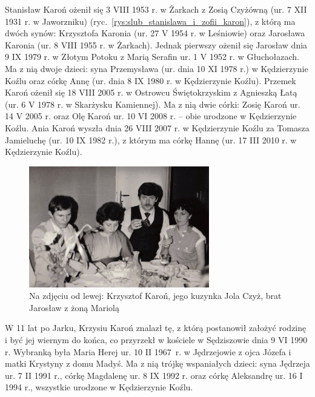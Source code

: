 Stanisław Karoń ożenił się 3 VIII 1953 r. w Żarkach z Zosią Czyżówną (ur. 7 XII 1931 r. w Jaworzniku) (ryc.~\ref{rys:slub_stanislawa_i_zofii_karon}), z którą ma dwóch synów: Krzysztofa Karonia (ur. 27 V 1954 r. w Leśniowie) oraz Jarosława Karonia (ur. 8 VIII 1955 r. w Żarkach). Jednak pierwszy ożenił się Jarosław dnia 9 IX 1979 r. w Złotym Potoku z Marią Serafin ur. 1 V 1952 r. w Głuchołazach. Ma z nią dwoje dzieci: syna Przemysława (ur. dnia 10 XI 1978 r.) w Kędzierzynie Koźlu oraz córkę Annę (ur. dnia 8 IX 1980 r. w Kędzierzynie Koźlu). Przemek Karoń ożenił się 18 VIII 2005 r. w Ostrowcu Świętokrzyskim z Agnieszką Łatą (ur. 6 V 1978 r. w Skarżysku Kamiennej). Ma z nią dwie córki: Zosię Karoń ur. 14 V 2005 r. oraz Olę Karoń ur. 10 VI 2008 r. -- obie urodzone w Kędzierzynie Koźlu. Ania Karoń wyszła dnia 26 VIII 2007 r. w Kędzierzynie Koźlu za Tomasza Jamieluchę (ur. 10 IX 1982 r.), z którym ma córkę Hannę (ur. 17 III 2010 r. w Kędzierzynie Koźlu).

\begin{figure}
\begin{center}
\includegraphics[width=0.7\textwidth]{zdjecia/krzysztof_karon_jarek_karon_z_zona.jpg}
\caption[Krzysztof, Jarosław i Mariola Karoniowie]{Na zdjęciu od lewej: Krzysztof Karoń, jego kuzynka Jola Czyż, brat Jarosław z żoną Mariolą}
\label{rys:krzysztof_karon_jarek_karon_z_zona.jpg}
\end{center}
\end{figure}

W 11 lat po Jarku, Krzysiu Karoń znalazł tę, z którą postanowił założyć rodzinę i być jej wiernym do końca, co przyrzekł w kościele w Sędziszowie dnia 9 VI 1990 r. Wybranką była Maria Herej ur. 10 II 1967~r. w Jędrzejowie z ojca Józefa i matki Krystyny z domu Madyś. Ma z nią trójkę wspaniałych dzieci: syna Jędrzeja ur. 7 II 1991 r., córkę Magdalenę ur. 8 IX 1992 r. oraz córkę Aleksandrę ur. 16 I 1994 r., wszystkie urodzone w Kędzierzynie Koźlu.


